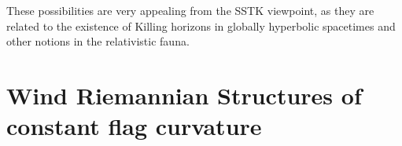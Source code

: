 \documentclass[reqno,10pt]{amsart}
\newcommand{\R}{\mathds R}
\begin{document}
 These possibilities are very appealing from the SSTK viewpoint, as they are related to the existence of Killing horizons in globally hyperbolic spacetimes and other notions in the relativistic fauna. 
 





\section{Wind Riemannian Structures of constant flag curvature}\label{s3}
\end{document}
